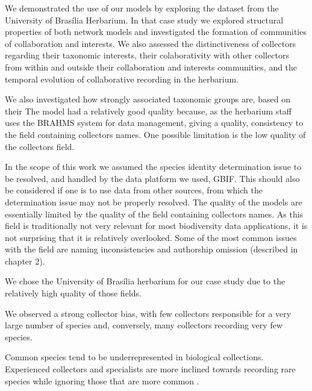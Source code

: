 
We demonstrated the use of our models by exploring the dataset from the University of Brasília Herbarium.
In that case study we explored structural properties of both network models and investigated the formation of communities of collaboration and interests.
We also assessed the distinctiveness of collectors regarding their taxonomic interests, their colaborativity with other collectors from within and outside their collaboration and interests communities, and the temporal evolution of collaborative recording in the herbarium.


We also investigated how strongly associated taxonomic groups are, based on their
The model had a relatively good quality because, as the herbarium staff uses the BRAHMS system for data management, giving a quality, consistency to the field containing collectors names.
One possible limitation is the low quality of the collectors field.




In the scope of this work we assumed the species identity determination issue to be resolved, and handled by the data platform we used, GBIF. 
This should also be considered if one is to use data from other sources, from which the determination issue may not be properly resolved.
The quality of the models are essentially limited by the quality of the field containing collectors names.
As this field is traditionally not very relevant for most biodiversity data applications, it is not surprising that it is relatively overlooked.
Some of the most common issues with the field are naming inconsistencies and authorship omission (described in chapter 2).




We chose the University of Brasília herbarium for our case study due to the relatively high quality of those fields.

We observed a strong collector bias, with few collectors responsible for a very large number of species and, conversely, many collectors recording very few species.

Common species tend to be underrepresented in biological collections.
Experienced collectors and specialists are more inclined towards recording rare species while ignoring those that are more common \cite{Nelson1990}.

